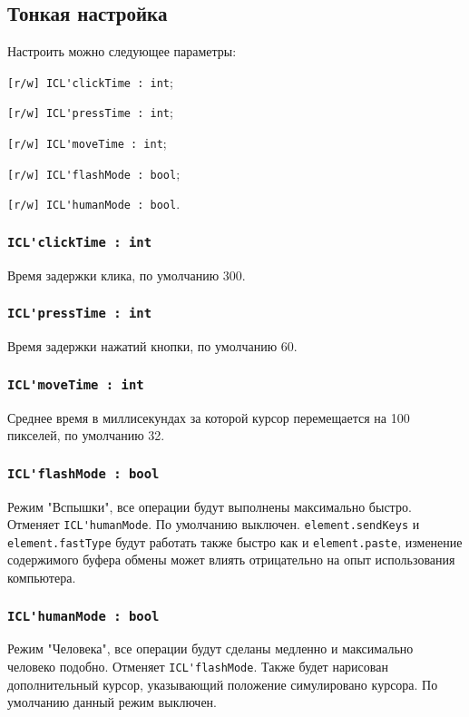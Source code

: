 \subsection{Тонкая настройка}

Настроить можно следующее параметры:
\begin{icItems}
	\item \lstinline|[r/w] ICL'clickTime : int|;
	\item \lstinline|[r/w] ICL'pressTime : int|;
	\item \lstinline|[r/w] ICL'moveTime : int|;
	\item \lstinline|[r/w] ICL'flashMode : bool|;
	\item \lstinline|[r/w] ICL'humanMode : bool|.
\end{icItems}

\subsubsection{\lstinline|ICL'clickTime : int|}

Время задержки клика, по умолчанию 300.

\subsubsection{\lstinline|ICL'pressTime : int|}

Время задержки нажатий кнопки, по умолчанию 60.

\subsubsection{\lstinline|ICL'moveTime : int|}

Среднее время в миллисекундах за которой курсор перемещается на 100 пикселей, по умолчанию 32.

\subsubsection{\lstinline|ICL'flashMode : bool|}

Режим "Вспышки", все операции будут выполнены максимально быстро. Отменяет \lstinline|ICL'humanMode|. По умолчанию выключен. \lstinline|element.sendKeys| и \lstinline|element.fastType| будут работать также быстро как и \lstinline|element.paste|, изменение содержимого буфера обмены может влиять отрицательно на опыт использования компьютера.

\subsubsection{\lstinline|ICL'humanMode : bool|}

Режим "Человека", все операции будут сделаны медленно и максимально человеко подобно. Отменяет \lstinline|ICL'flashMode|. Также будет нарисован дополнительный курсор, указывающий положение симулировано курсора. По умолчанию данный режим выключен.


